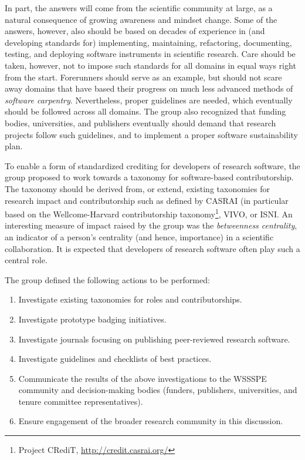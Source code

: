 \documentclass[11pt, oneside]{amsart}
\newcommand{\choinote}[1]{ {\textcolor{orange}    {***Choi: #1 }}}
\begin{document}
In part, the answers will come from the scientific community at large, as a
natural consequence of growing awareness and mindset change. Some of the
answers, however, also should be based on decades of experience in (and
developing standards for) implementing, maintaining, refactoring, documenting,
testing, and deploying software instruments in scientific research. Care should
be taken, however, not to impose such standards for all domains in equal ways
right from the start. Forerunners should serve as an example, but should not
scare away domains that have based their progress on much less advanced methods
of {\em software carpentry}. Nevertheless, proper guidelines are needed, which
eventually should be followed across all domains. The group also recognized that
funding bodies, universities, and publishers eventually should demand that
research projects follow such guidelines, and to implement a proper software
sustainability plan.

To enable a form of standardized crediting for developers of research software,
the group proposed to work towards a taxonomy for software-based
contributorship. The taxonomy should be derived from, or extend, existing
taxonomies for research impact and contributorship such as defined by CASRAI (in
particular based on the Wellcome-Harvard contributorship
taxonomy\footnote{Project CRediT, \url{http://credit.casrai.org/}}, VIVO, or
ISNI. An interesting measure of impact raised by the group was the {\em
betweenness centrality}, an indicator of a person's centrality (and hence,
importance) in a scientific collaboration. It is expected that developers of
research software often play such a central role. %

The group defined the following actions to be performed:
\begin{enumerate}
\item Investigate existing taxonomies for roles and contributorships.
\item Investigate prototype badging initiatives.
\item Investigate journals focusing on publishing peer-reviewed research
software.
\item Investigate guidelines and checklists of best practices.
\item Communicate the results of the above investigations to the WSSSPE
community and decision-making bodies (funders, publishers, universities,
and tenure committee representatives).
\item Ensure engagement of the broader research community in this discussion.
\end{enumerate}
\end{document}
